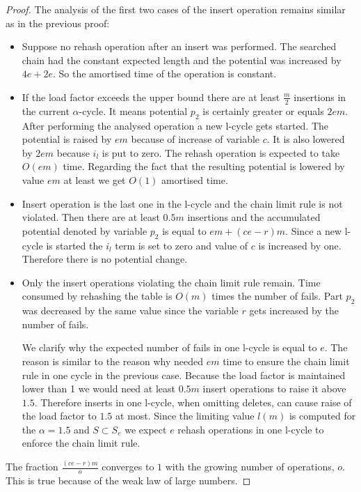 \begin{proof}
The analysis of the first two cases of the insert operation remains similar as in the previous proof:
\begin{itemize}
\item Suppose no rehash operation after an insert was performed. The searched chain had the constant expected length and the potential was increased by $4e + 2e$. So the amortised time of the operation is constant.
\item If the load factor exceeds the upper bound there are at least $\frac{m}{2}$ insertions in the current $\alpha$-cycle. It means potential $p_2$ is certainly greater or equals $2em$. After performing the analysed operation a new l-cycle gets started. The potential is raised by $em$ because of increase of variable $c$. It is also lowered by $2em$ because $i_l$ is put to zero. The rehash operation is expected to take $O(em)$ time. Regarding the fact that the resulting potential is lowered by value $em$ at least we get $O(1)$ amortised time.
\item Insert operation is the last one in the l-cycle and the chain limit rule is not violated. Then there are at least $0.5 m$ insertions and the accumulated potential denoted by variable $p_2$ is equal to $em + (ce - r)m$. Since a new l-cycle is started the $i_l$ term is set to zero and value of $c$ is increased by one. Therefore there is no potential change.
\item Only the insert operations violating the chain limit rule remain. Time consumed by rehashing the table is $O(m)$ times the number of fails. Part $p_2$ was decreased by the same value since the variable $r$ gets increased by the number of fails. 

We clarify why the expected number of fails in one l-cycle is equal to $e$. The reason is similar to the reason why needed $em$ time to ensure the chain limit rule in one cycle in the previous case. Because the load factor is maintained lower than 1 we would need at least $0.5 m$ insert operations to raise it above $1.5$. Therefore inserts in one l-cycle, when omitting deletes, can cause raise of the load factor to $1.5$ at most. Since the limiting value $l(m)$ is computed for the $\alpha = 1.5$ and $S \subset S_e$ we expect $e$ rehash operations in one l-cycle to enforce the chain limit rule.
\end{itemize}

The fraction $\frac{(ce - r)m}{o}$ converges to $1$ with the growing number of operations, $o$. This is true because of the weak law of large numbers.
\end{proof}
